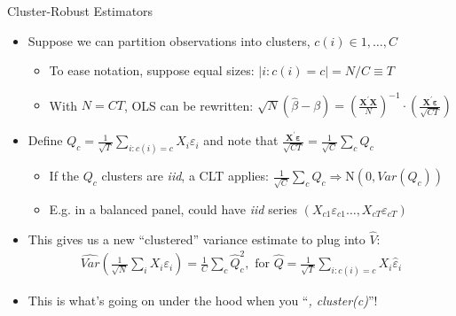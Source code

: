 \documentclass[11pt,english]{beamer}
\begin{document}
\begin{frame}{Cluster-Robust Estimators}
\begin{itemize}
\item Suppose we can partition observations into clusters, $c(i)\in{1,\dots,C}$\smallskip
\begin{itemize}
\item To ease notation, suppose equal sizes: $|i:c(i)=c|=N/C\equiv T$\smallskip\pause{}
\item With $N=CT$, OLS can be rewritten: $\sqrt{N}(\hat\beta - \beta) = \left(\frac{\mathbf{X}^\prime\mathbf{X}}{N}\right)^{-1}\cdot \left(\frac{\mathbf{X}^\prime\boldsymbol\varepsilon}{\sqrt{CT}}\right)$
\end{itemize}\medskip\pause{}

\item Define $Q_c=\frac{1}{\sqrt T}\sum_{i:c(i)=c}X_i\varepsilon_i$ and note that $\frac{\mathbf{X}^\prime\boldsymbol\varepsilon}{\sqrt{CT}}=\frac{1}{\sqrt{C}}\sum_c Q_c$\smallskip\pause{}
\begin{itemize}
\item If the $Q_c$ clusters are \emph{iid}, a CLT applies: $\frac{1}{\sqrt{C}}\sum_c Q_c\Rightarrow \mathrm{N}(0,Var(Q_c))$\smallskip
\item E.g. in a balanced panel, could have \emph{iid} series $(X_{c1}\varepsilon_{c1}\dots,X_{cT}\varepsilon_{cT})$
\end{itemize}\medskip\pause{}

\item This gives us a new ``clustered'' variance estimate to plug into $\hat{V}$:
\begin{align*}
\widehat{Var}\left(\frac{1}{\sqrt{N}}\sum_i X_i\varepsilon_i\right)=\frac{1}{C}\sum_c \hat{Q}_c^2,\text{ for }\hat{Q}=\frac{1}{\sqrt{T}}\sum_{i:c(i)=c}X_i\hat\varepsilon_i
\end{align*}\pause{}

\item This is what's going on under the hood when you ``\emph{, cluster(c)}''!
\end{itemize}
\end{frame}
\end{document}
